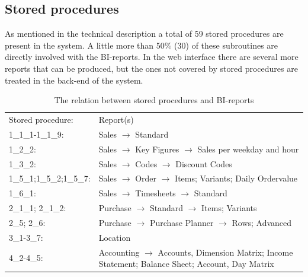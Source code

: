\documentclass{cslthse-msc}
\begin{document}
\subsection{Stored procedures}\label{sec:sp}
As mentioned in the technical description a total of 59 stored procedures are present in the system. A little more than 50\% (30) of these subroutines are directly involved with the BI-reports. In the web interface there are several more reports that can be produced, but the ones not covered by stored procedures are treated in the back-end of the system.  
\begin{table}[H]
\begin{center}
\begin{tabular}{l p{9cm}}
Stored procedure: & Report(s)\\
1\_1\_1-1\_1\_9: & Sales $\rightarrow$ Standard\\
1\_2\_2: & Sales $\rightarrow$ Key Figures $\rightarrow$ Sales per weekday and hour \\
1\_3\_2: & Sales $\rightarrow$ Codes $\rightarrow$ Discount Codes  \\
1\_5\_1;1\_5\_2;1\_5\_7: & Sales $\rightarrow$ Order $\rightarrow$ Items; Variants; Daily Ordervalue\\
1\_6\_1: & Sales $\rightarrow$ Timesheets $\rightarrow$ Standard \\
2\_1\_1; 2\_1\_2: & Purchase $\rightarrow$ Standard $\rightarrow$ Items; Variants \\
2\_5; 2\_6: & Purchase $\rightarrow$ Purchase Planner $\rightarrow$ Rows; Advanced\\
3\_1-3\_7: & Location \\
4\_2-4\_5: & Accounting $\rightarrow$ Accounts, Dimension Matrix; Income Statement; Balance Sheet; Account, Day Matrix \\
\end{tabular}
\caption{The relation between stored procedures and BI-reports}
\end{center}
\end{table}
\end{document}
